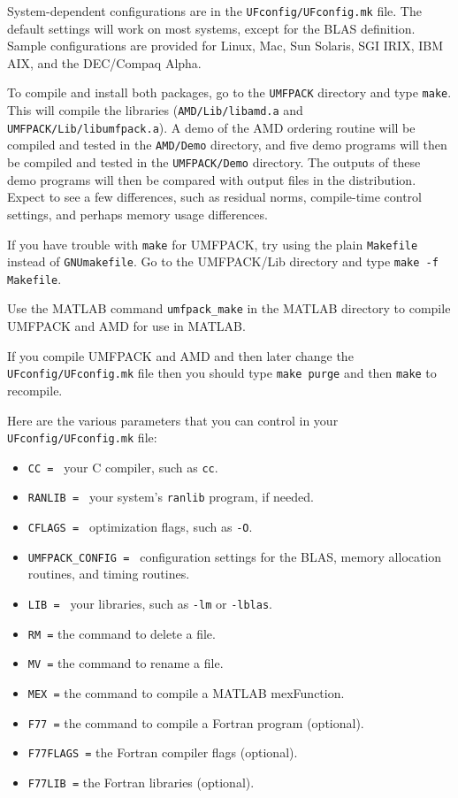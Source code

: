 \documentclass[11pt]{article}
\begin{document}
System-dependent configurations are in the {\tt UFconfig/UFconfig.mk}
file.  The default
settings will work on most systems, except for the BLAS definition.
Sample configurations are provided
for Linux, Mac, Sun Solaris, SGI IRIX, IBM AIX, and the DEC/Compaq Alpha.

To compile and install both packages,
go to the {\tt UMFPACK} directory and type {\tt make}.  This will compile the
libraries ({\tt AMD/Lib/libamd.a} and {\tt UMFPACK/Lib/libumfpack.a}).
A demo of the AMD ordering routine will be compiled and tested in
the {\tt AMD/Demo} directory, and five demo programs will then be
compiled and tested in the {\tt UMFPACK/Demo} directory.
The outputs of these demo programs will then be compared with output
files in the distribution.  Expect to see a few differences, such as
residual norms, compile-time control settings, and perhaps memory usage
differences.

If you have trouble with {\tt make} for UMFPACK,
try using the plain {\tt Makefile} instead of {\tt GNUmakefile}.
Go to the UMFPACK/Lib directory and type {\tt make -f Makefile}.

Use the MATLAB command {\tt umfpack\_make} in the MATLAB directory
to compile UMFPACK and AMD for use in MATLAB.

If you compile UMFPACK and AMD and then later change the
{\tt UFconfig/UFconfig.mk} file
then you should type {\tt make purge} and then {\tt make} to recompile.

Here are the various parameters that you can control in your
{\tt UFconfig/UFconfig.mk} file:

\begin{itemize}
\item {\tt CC = } your C compiler, such as {\tt cc}.
\item {\tt RANLIB = } your system's {\tt ranlib} program, if needed.
\item {\tt CFLAGS = } optimization flags, such as {\tt -O}.
\item {\tt UMFPACK\_CONFIG = } configuration settings for the BLAS,
    memory allocation routines, and timing routines.
\item {\tt LIB = } your libraries, such as {\tt -lm} or {\tt -lblas}.
\item {\tt RM =} the command to delete a file.
\item {\tt MV =} the command to rename a file.
\item {\tt MEX =} the command to compile a MATLAB mexFunction.
\item {\tt F77 =} the command to compile a Fortran program (optional).
\item {\tt F77FLAGS =} the Fortran compiler flags (optional).
\item {\tt F77LIB =} the Fortran libraries (optional).
\end{itemize}
\end{document}
